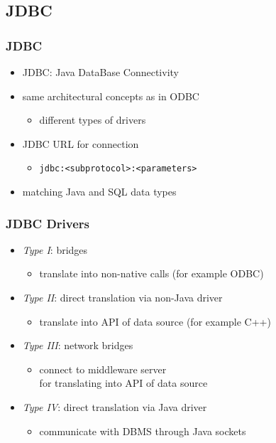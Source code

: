 \documentclass[dvipsnames]{beamer}
\theoremstyle{plain}
\begin{document}
\lstset{language=Java}

\subsection{JDBC}

\begin{frame}
  \frametitle{JDBC}

  \begin{itemize}
    \item \alert{JDBC}: Java DataBase Connectivity

    \pause
    \item same architectural concepts as in ODBC
    \begin{itemize}
      \item different types of drivers
    \end{itemize}

    \pause
    \item JDBC URL for connection
    \begin{itemize}
      \item \lstinline!jdbc:<subprotocol>:<parameters>!
    \end{itemize}

    \pause
    \item matching Java and SQL data types
  \end{itemize}
\end{frame}

\begin{frame}
  \frametitle{JDBC Drivers}

  \begin{itemize}
    \item \emph{Type I}: bridges
    \begin{itemize}
      \item translate into non-native calls (for example ODBC)
    \end{itemize}

    \pause
    \item \emph{Type II}: direct translation via non-Java driver
    \begin{itemize}
      \item translate into API of data source (for example C++)
    \end{itemize}

    \pause
    \item \emph{Type III}: network bridges
    \begin{itemize}
      \item connect to middleware server\\
	for translating into API of data source
    \end{itemize}

    \pause
    \item \emph{Type IV}: direct translation via Java driver
    \begin{itemize}
      \item communicate with DBMS through Java sockets
    \end{itemize}
  \end{itemize}
\end{frame}
\end{document}
